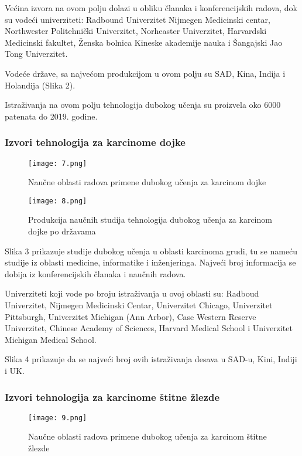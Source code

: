 \documentclass[a4paper]{article}
\begin{document}
Većina izvora na ovom polju dolazi u obliku članaka i konferencijskih radova, dok su vodeći univerziteti: Radbound Univerzitet Nijmegen Medicinski centar, Northwester Politehnički Univerzitet, Norheaster Univerzitet, Harvardski Medicinski fakultet, Ženska bolnica Kineske akademije nauka i Šangajski Jao Tong Univerzitet.

Vodeće države, sa najvećom produkcijom u ovom polju su SAD, Kina, Indija i Holandija (Slika 2).

Istraživanja na ovom polju tehnologija dubokog učenja su proizvela oko 6000 patenata do 2019. godine.


\FloatBarrier
\subsubsection{Izvori tehnologija za karcinome dojke}
\label{subsec:ppnaslov3}


\begin{figure}[hbt!]
\centering
\texttt{[image: 7.png]}
\caption{Naučne oblasti radova primene dubokog učenja za karcinom dojke}
\end{figure}

\begin{figure}[hbt!]
\centering
\texttt{[image: 8.png]}
\caption{Produkcija naučnih studija tehnologija dubokog učenja za karcinom dojke po državama}
\end{figure}


Slika 3 prikazuje studije dubokog učenja u oblasti karcinoma grudi, tu se nameću studije iz oblasti medicine, informatike i inženjeringa.
Najveći broj informacija se dobija iz konferencijskih članaka i naučnih radova.

Univerziteti koji vode po broju istraživanja u ovoj oblasti su: Radboud Univerzitet, Nijmegen Medicinski Centar, Univerzitet Chicago, Univerzitet Pittsburgh,
Univerzitet Michigan (Ann Arbor), Case Western Reserve Univerzitet, Chinese Academy of Sciences,
Harvard Medical School i Univerzitet Michigan Medical School.

Slika 4 prikazuje da se najveći broj ovih istraživanja desava u SAD-u, Kini, Indiji i UK.


\FloatBarrier
\subsubsection{Izvori tehnologija za karcinome štitne žlezde}
\label{subsec:ppnaslov4}

\begin{figure}[hbt!]
\centering
\texttt{[image: 9.png]}
\caption{Naučne oblasti radova primene dubokog učenja za karcinom štitne žlezde}
\end{figure}
\end{document}
